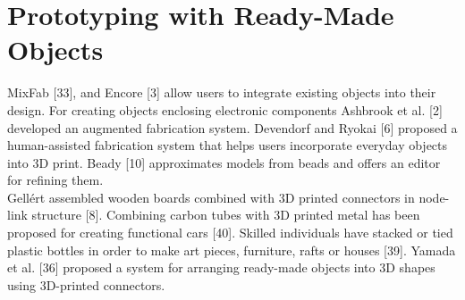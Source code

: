 \section{Prototyping with Ready-Made Objects}
MixFab [33], and Encore [3] allow users to integrate existing objects into their design. For creating objects enclosing electronic components Ashbrook et al. [2] developed an augmented fabrication system. Devendorf and Ryokai [6] proposed a human-assisted fabrication system that helps users incorporate everyday objects into 3D print. Beady [10] approximates models from beads and offers an editor for refining them.\\
Gellért assembled wooden boards combined with 3D printed connectors in node-link structure [8]. Combining carbon tubes with 3D printed metal has been proposed for creating functional cars [40].
Skilled individuals have stacked or tied plastic bottles in order to make art pieces, furniture, rafts or houses [39]. Yamada et al. [36] proposed a system for arranging ready-made objects into 3D shapes using 3D-printed connectors.

